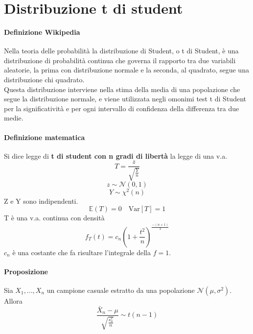 \documentclass[12pt, a4paper, openany]{book}
\begin{document}
\section{Distribuzione t di student}
\paragraph*{Definizione Wikipedia} 
Nella teoria delle probabilità la distribuzione di Student, o t di Student, 
è una distribuzione di probabilità continua che governa il rapporto tra due variabili aleatorie, 
la prima con distribuzione normale e la seconda, al quadrato, segue una distribuzione chi quadrato.
\\ Questa distribuzione interviene nella stima della media di una popolazione che segue la distribuzione normale, 
e viene utilizzata negli omonimi test t di Student per la significatività e per ogni intervallo 
di confidenza della differenza tra due medie. 
\paragraph*{Definizione matematica}Si dice legge di \textbf{t di student con n gradi di libertà} la legge di una v.a.
\begin{equation*}
    T = \frac{z}{\sqrt{\frac{Y}{n}}}
\end{equation*}
\begin{equation*}
    z \sim \mathcal{N}(0,1)
\end{equation*}
\begin{equation*}
    Y \sim \chi^2(n)
\end{equation*}
Z e Y sono indipendenti.
\begin{equation*}
    \mathbb{E}(T)=0 \quad \text{Var}[T] = 1
\end{equation*}
T è una v.a. continua con densità
\begin{equation*}
    f_T(t) = c_n(1+\frac{t^2}{n})^{\frac{-(n+1)}{2}}
\end{equation*}
$c_n$ è una costante che fa risultare l'integrale della $f = 1$.
\paragraph*{Proposizione} Sia $X_1, ..., X_n$ un campione casuale estratto da
una popolazione $\mathcal{N}(\mu, \sigma^2)$. Allora
\begin{equation*}
    \frac{\bar{X}_n-\mu}{\sqrt{\frac{s^2_{n}}{n}}} \sim t(n-1)
\end{equation*}
\end{document}
